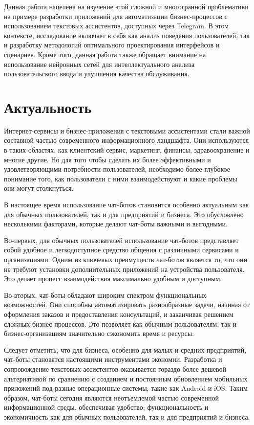 \documentclass{article}
\begin{document}
Данная работа нацелена на изучение этой сложной и многогранной проблематики на примере разработки приложений для автоматизации бизнес-процессов с использованием текстовых ассистентов, доступных через Telegram. В этом контексте, исследование включает в себя как анализ поведения пользователей, так и разработку методологий оптимального проектирования интерфейсов и сценариев. Кроме того, данная работа также обращает внимание на использование нейронных сетей для интеллектуального анализа пользовательского ввода и улучшения качества обслуживания.
\section{Актуальность}
Интернет-сервисы и бизнес-приложения с текстовыми ассистентами стали важной составной частью современного информационного ландшафта. Они используются в таких областях, как клиентский сервис, маркетинг, финансы, здравоохранение и многие другие. Но для того чтобы сделать их более эффективными и удовлетворяющими потребности пользователей, необходимо более глубокое понимание того, как пользователи с ними взаимодействуют и какие проблемы они могут столкнуться.

В настоящее время использование чат-ботов становится особенно актуальным как для обычных пользователей, так и для предприятий и бизнеса. Это обусловлено несколькими факторами, которые делают чат-боты важными и выгодными.

Во-первых, для обычных пользователей использование чат-ботов представляет собой удобное и легкодоступное средство общения с различными сервисами и организациями. Одним из ключевых преимуществ чат-ботов является то, что они не требуют установки дополнительных приложений на устройства пользователя. Это делает процесс взаимодействия максимально удобным и доступным.

Во-вторых, чат-боты обладают широким спектром функциональных возможностей. Они способны автоматизировать разнообразные задачи, начиная от оформления заказов и предоставления консультаций, и заканчивая решением сложных бизнес-процессов. Это позволяет как обычным пользователям, так и бизнес-организациям значительно сэкономить время и ресурсы.

Следует отметить, что для бизнеса, особенно для малых и средних предприятий, чат-боты становятся настоящими инструментами экономии. Разработка и сопровождение текстовых ассистентов оказывается гораздо более дешевой альтернативой по сравнению с созданием и постоянным обновлением мобильных приложений под разные операционные системы, такие как Android и iOS.
Таким образом, чат-боты сегодня являются неотъемлемой частью современной информационной среды, обеспечивая удобство, функциональность и экономичность как для обычных пользователей, так и для предприятий и бизнеса.
\end{document}

